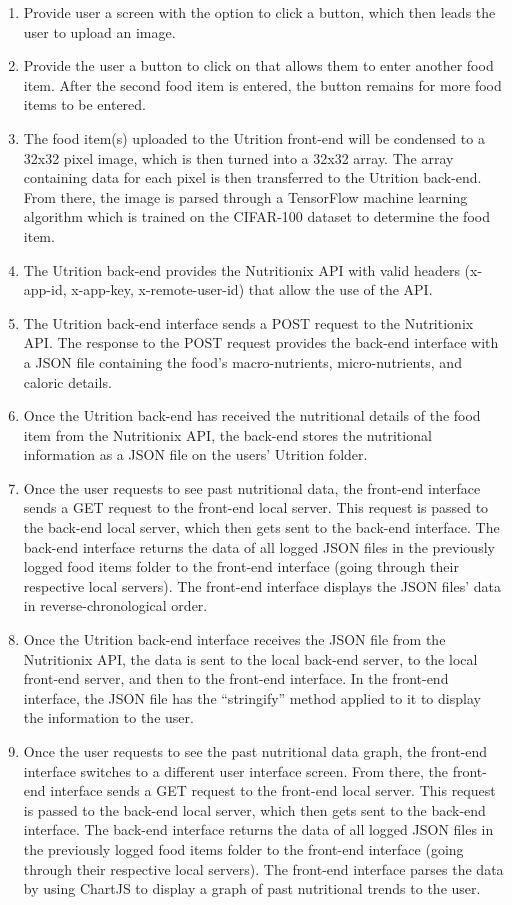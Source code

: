 \documentclass[12pt, titlepage]{article}
\begin{document}
\begin{enumerate}[{FR}1. ]
	\item Provide user a screen with the option to click a button, which then leads the user to upload an image.
	\item Provide the user a button to click on that allows them to enter another food item. After the second food item is entered, the button remains for more food items to be entered.
	\item The food item(s) uploaded to the Utrition front-end will be condensed to a 32x32 pixel image, which is then turned into a 32x32 array. The array containing data for each pixel is then transferred to the Utrition back-end. From there, the image is parsed through a TensorFlow machine learning algorithm which is trained on the CIFAR-100 dataset to determine the food item.
	\item The Utrition back-end provides the Nutritionix API with valid headers (x-app-id, x-app-key, x-remote-user-id) that allow the use of the API.
	\item The Utrition back-end interface sends a POST request to the Nutritionix API. The response to the POST request provides the back-end interface with a JSON file containing the food’s macro-nutrients, micro-nutrients, and caloric details.
	\item Once the Utrition back-end has received the nutritional details of the food item from the Nutritionix API, the back-end stores the nutritional information as a JSON file on the users’ Utrition folder.
	\item Once the user requests to see past nutritional data, the front-end interface sends a GET request to the front-end local server. This request is passed to the back-end local server, which then gets sent to the back-end interface. The back-end interface returns the data of all logged JSON files in the previously logged food items folder to the front-end interface (going through their respective local servers). The front-end interface displays the JSON files’ data in reverse-chronological order.
	\item Once the Utrition back-end interface receives the JSON file from the Nutritionix API, the data is sent to the local back-end server, to the local front-end server, and then to the front-end interface. In the front-end interface, the JSON file has the “stringify” method applied to it to display the information to the user.
	\item Once the user requests to see the past nutritional data graph, the front-end interface switches to a different user interface screen. From there, the front-end interface sends a GET request to the front-end local server. This request is passed to the back-end local server, which then gets sent to the back-end interface. The back-end interface returns the data of all logged JSON files in the previously logged food items folder to the front-end interface (going through their respective local servers). The front-end interface parses the data by using ChartJS to display a graph of past nutritional trends to the user.
\end{enumerate}
\end{document}

